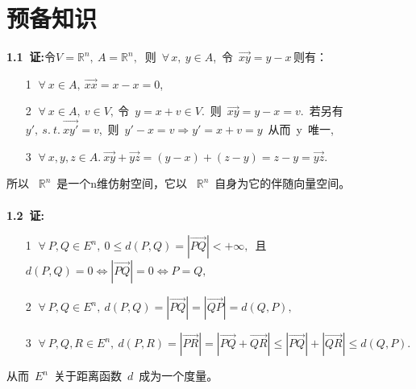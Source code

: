 \chapter{预备知识}
	\noindent
	{\textbf{1.1\ 证:}}令$V=\mathbb{R}^n,\  A=\mathbb{R}^n,\ $ 则\  $\forall\,x,\ y\in{A}$,\ 令\ $\overrightarrow{xy}=y-x\,$则有：
	\begin{itemize}
		\item[\textcircled{1}]
		$\forall\ x\in{A},\ \overrightarrow{xx}=x-x=\mathit{0}$,
		\item[\textcircled{2}]
		$\forall\ x\in{A},\ v\in{V},\ $令\ $y=x+v\in{V}$.\ 则\ $\overrightarrow{xy}=y-x=v$.\ 若另有\ $y',\ s.\ t.\ \overrightarrow{xy'}=v$,\ 则\ $y'-x=v\Rightarrow y'=x+v=y$\ 从而\ y\ 唯一,
		\item[\textcircled{3}]
		$\forall\ x,y,z\in A.\ \overrightarrow{xy}+\overrightarrow{yz}=(y-x)+(z-y)=z-y=\overrightarrow{yz}.\ $
	\end{itemize}
	所以 \ $\mathbb{R}^n$\ 是一个n维仿射空间，它以 \ $\mathbb{R}^n$\ 自身为它的伴随向量空间。
	\\
	\\
	
	\noindent
	{\textbf{1.2\ 证:}}
	\begin{itemize}
		\item[\textcircled{1}]
		$\forall\  P,Q\in E^n,\ 0\leqslant d(P,Q)=\left|\overrightarrow{PQ}\right|<+\infty,$\ 且$d(P,Q)=0\Leftrightarrow\left|\overrightarrow{PQ}\right|=0\Leftrightarrow P=Q,$ 
		\item[\textcircled{2}] 
		$\forall\ P,Q\in E^n,\ d(P,Q)=\left|\overrightarrow{PQ}\right|=\left|\overrightarrow{QP}\right|=d(Q,P),$
		\item[\textcircled{3}] 
		$\forall\  P, Q, R\in E^n,\  d(P,R)=\left|\overrightarrow{PR}\right|=\left|\overrightarrow{PQ}+\overrightarrow{QR}\right|\leqslant\left|\overrightarrow{PQ}\right|+\left|\overrightarrow{QR}\right|\leqslant d(Q,P).$
	\end{itemize}
	从而\ $E^n$\ 关于距离函数\ $d$\ 成为一个度量。
	\\
	\\
	
